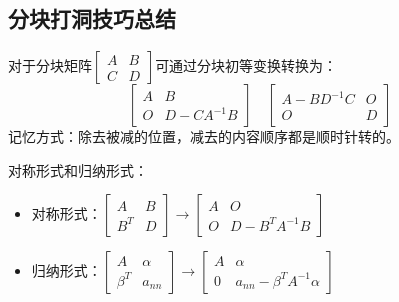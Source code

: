 \subsection{分块打洞技巧总结}

\begin{theorem}[分块打洞]
  对于分块矩阵$\left[
    \begin{array}{cc}
      A&B\\
      C&D
    \end{array}
  \right]$可通过分块初等变换转换为：
  \begin{equation*}
    \left[
      \begin{array}{cc}
        A&B\\
        O&D - CA^{-1}B
      \end{array} 
    \right] \quad \left[
      \begin{array}{cc}
        A - BD^{-1}C&O\\
        O&D
      \end{array}
    \right]
  \end{equation*}
  记忆方式：除去被减的位置，减去的内容顺序都是顺时针转的。
\end{theorem}

\begin{corollary}[两种特殊形式]
  对称形式和归纳形式：
  \begin{itemize}
  \item 对称形式：$\left[
      \begin{array}{cc}
        A&B\\
        B^T&D
      \end{array}
    \right]
    \rightarrow
    \left[
      \begin{array}{cc}
        A&O\\
        O&D - B^TA^{-1}B
      \end{array}
    \right]
    $
  \item 归纳形式：$\left[
      \begin{array}{cc}
        A&\alpha\\
        \beta^T&a_{nn}
      \end{array}
    \right]
    \rightarrow 
    \left[
      \begin{array}{cc}
        A&\alpha\\
        0&a_{nn} - \beta^T A^{-1}\alpha
      \end{array}
    \right]
    $
  \end{itemize}
\end{corollary}


